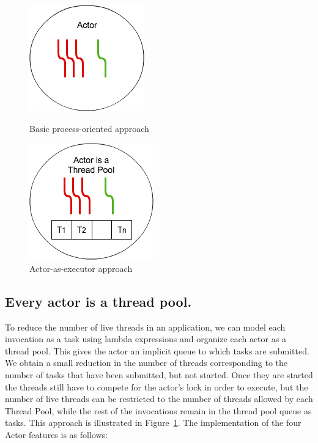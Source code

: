 \begin{figure}
	\centering
	\begin{minipage}{.47\textwidth}
		\centering
		\includegraphics[scale=0.74]{mt.png}
		\caption{Basic process-oriented approach}
		\label{tp}
	\end{minipage}
	\begin{minipage}{.52\textwidth}
		\centering
		\includegraphics[scale=0.75]{atp.png}
		\caption{Actor-as-executor approach}
		\label{atp}	
	\end{minipage}
\end{figure}

\subsection{Every actor is a thread pool.}
To reduce the number of live threads in an application, we can model each invocation as a task using lambda expressions and organize each actor as a thread pool. This gives the actor an implicit queue to which tasks are submitted. We obtain a small reduction in the number of threads corresponding to the number of tasks that have been submitted, but not started. Once they are started the threads still have to compete for the actor's lock in order to execute, but the number of live threads can be restricted to the number of threads allowed by each Thread Pool, while the rest of the invocations remain in the thread pool queue as tasks. This approach is illustrated in Figure~\ref{atp}. The implementation of the four Actor features is as follows:

